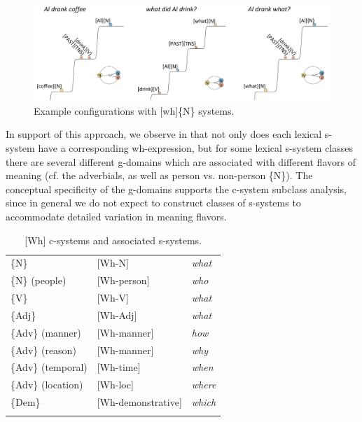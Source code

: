   
\begin{figure}
\includegraphics[width=\textwidth]{figures/Tilsen-img158.png}
\caption{Example configurations with [wh]\{N\} systems.}
\label{fig:7:14}
\end{figure}
 

  In support of this approach, we observe in {} that not only does each lexical s-system have a corresponding wh-expression, but for some lexical s-system classes there are several different g-domains which are associated with different flavors of meaning (cf. the adverbials, as well as person vs. non-person \{N\}). The conceptual specificity of the g-domains supports the c-system subclass analysis, since in general we do not expect to construct classes of s-systems to accommodate detailed variation in meaning flavors.

\begin{table}
\begin{tabularx}{\textwidth}{XXX}
\lsptoprule
\{N\} & [Wh-N] & \textit{what}\\
\{N\} (people) & [Wh-person] & \textit{who}\\
\{V\} & [Wh-V] & \textit{what}\\
\{Adj\} & [Wh-Adj] & \textit{what}\\
\{Adv\} (manner) & [Wh-manner] & \textit{how}\\
\{Adv\} (reason) & [Wh-manner] & \textit{why}\\
\{Adv\} (temporal) & [Wh-time] & \textit{when}\\
\{Adv\} (location) & [Wh-loc] & \textit{where}\\
\{Dem\} & [Wh-demonstrative] & \textit{which}\\
\lspbottomrule
\end{tabularx}
\caption{[Wh] c-systems and associated s-systems.}\label{tab:7:4}
\end{table}

